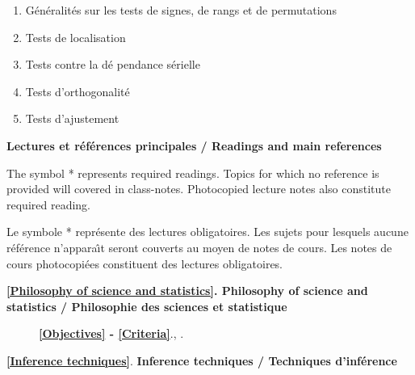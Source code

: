 \documentclass[titlepage,11pt,amstex]{article}
\begin{document}
\begin{enumerate}
\item \label{Sign and rank tests}G\'{e}n\'{e}ralit\'{e}s sur les tests de
signes, de rangs et de permutations

\item \label{Distribution-free location tests}Tests de localisation

\item \label{Distribution-free serial dependence tests}Tests contre la d\'{e}%
pendance s\'{e}rielle

\item \label{Distribution-free orthogonality tests}Tests d'orthogonalit\'{e}

\item \label{Goodness-of-fit tests}Tests d'ajustement
\end{enumerate}

\newpage

\begin{center}
\textbf{Lectures et r\'{e}f\'{e}rences principales / Readings and main
references}

\quad
\end{center}

\quad

The symbol * represents required readings. Topics for which no reference is
provided will covered in class-notes. Photocopied lecture notes also
constitute required reading.

Le symbole * repr\'{e}sente des lectures obligatoires. Les sujets pour
lesquels aucune r\'{e}f\'{e}rence n'appara\^{\i}t seront couverts au moyen
de notes de cours. Les notes de cours photocopi\'{e}es constituent des
lectures obligatoires.

\quad

\noindent \textbf{\ref{Philosophy of science and statistics}. Philosophy of
science and statistics / Philosophie des sciences et statistique}

\quad

\begin{description}
\item[\quad ] \textbf{\ref{Objectives} - \ref{Criteria}}.\quad \cite%
{Dufour(2000)}, \cite{Dufour(2001)}.
\end{description}

\quad

\noindent \textbf{\ref{Inference techniques}}. \textbf{Inference techniques
/ Techniques d'inf\'{e}rence}

\quad
\end{document}
